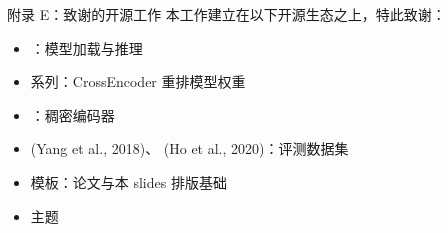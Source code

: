 \begin{frame}{附录 E：致谢的开源工作}
  \footnotesize
  本工作建立在以下开源生态之上，特此致谢：
  \begin{itemize}
    \item {}：模型加载与推理
    \item {} 系列：CrossEncoder 重排模型权重
    \item {}：稠密编码器
    \item {} (Yang et al., 2018)、 (Ho et al., 2020)：评测数据集
    \item {} 模板：论文与本 slides 排版基础
    \item {} 主题
  \end{itemize}
\end{frame}

